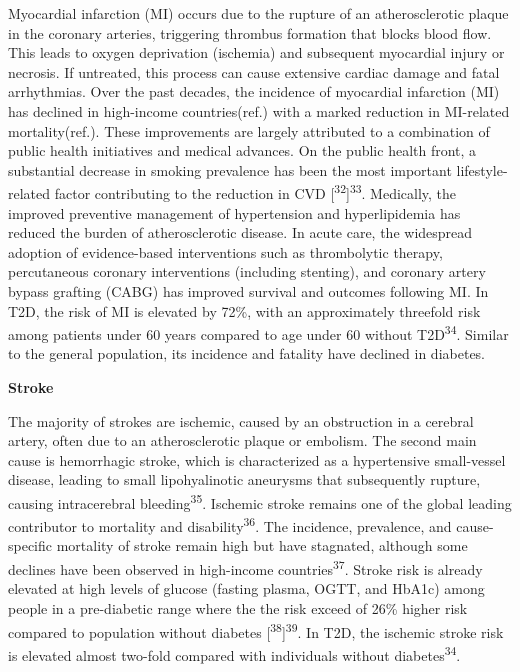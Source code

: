 \documentclass[
  a4paper,
  headsepline=true,
  open=any]{scrbook}
\begin{document}
Myocardial infarction (MI) occurs due to the rupture of an
atherosclerotic plaque in the coronary arteries, triggering thrombus
formation that blocks blood flow. This leads to oxygen deprivation
(ischemia) and subsequent myocardial injury or necrosis. If untreated,
this process can cause extensive cardiac damage and fatal arrhythmias.
Over the past decades, the incidence of myocardial infarction (MI) has
declined in high-income countries(ref.) with a marked reduction in
MI-related mortality(ref.). These improvements are largely attributed to
a combination of public health initiatives and medical advances. On the
public health front, a substantial decrease in smoking prevalence has
been the most important lifestyle-related factor contributing to the
reduction in CVD {[}\textsuperscript{32}{]}\textsuperscript{33}.
Medically, the improved preventive management of hypertension and
hyperlipidemia has reduced the burden of atherosclerotic disease. In
acute care, the widespread adoption of evidence-based interventions such
as thrombolytic therapy, percutaneous coronary interventions (including
stenting), and coronary artery bypass grafting (CABG) has improved
survival and outcomes following MI. In T2D, the risk of MI is elevated
by 72\%, with an approximately threefold risk among patients under 60
years compared to age under 60 without T2D\textsuperscript{34}. Similar
to the general population, its incidence and fatality have declined in
diabetes.

\textbf{Stroke}

The majority of strokes are ischemic, caused by an obstruction in a
cerebral artery, often due to an atherosclerotic plaque or embolism. The
second main cause is hemorrhagic stroke, which is characterized as a
hypertensive small-vessel disease, leading to small lipohyalinotic
aneurysms that subsequently rupture, causing intracerebral
bleeding\textsuperscript{35}. Ischemic stroke remains one of the global
leading contributor to mortality and disability\textsuperscript{36}. The
incidence, prevalence, and cause-specific mortality of stroke remain
high but have stagnated, although some declines have been observed in
high-income countries\textsuperscript{37}. Stroke risk is already
elevated at high levels of glucose (fasting plasma, OGTT, and HbA1c)
among people in a pre-diabetic range where the the risk exceed of 26\%
higher risk compared to population without diabetes
{[}\textsuperscript{38}{]}\textsuperscript{39}. In T2D, the ischemic
stroke risk is elevated almost two-fold compared with individuals
without diabetes\textsuperscript{34}.
\end{document}
